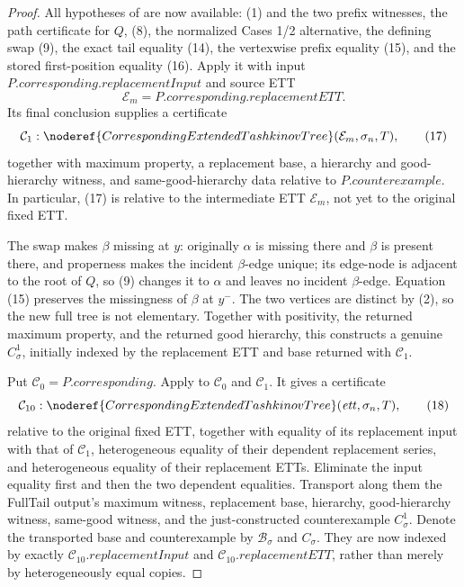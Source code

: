 \begin{proof}
All hypotheses of  are now
available: (1) and the two prefix witnesses, the path certificate for
\(Q\), (8), the normalized Cases 1/2 alternative, the defining swap (9),
the exact tail equality (14), the vertexwise prefix equality (15), and the
stored first-position equality (16).  Apply it with input
\(P.\mathit{corresponding}.\mathit{replacementInput}\) and source ETT
\[
 \mathcal E_m=P.\mathit{corresponding}.\mathit{replacementETT}.
\]
Its final conclusion supplies a certificate
\[
 \mathcal C_1:
 \noderef{CorrespondingExtendedTashkinovTree}
   (\mathcal E_m,\sigma_n,T),                                  \tag{17}
\]
together with maximum property, a replacement base, a hierarchy and
good-hierarchy witness, and same-good-hierarchy data relative to
\(P.\mathit{counterexample}\).  In particular, (17) is relative to the
intermediate ETT \(\mathcal E_m\), not yet to the original fixed ETT.

The swap makes \(\beta\) missing at \(y\): originally \(\alpha\) is
missing there and \(\beta\) is present there, and properness makes the
incident \(\beta\)-edge unique; its edge-node is adjacent to the root of
\(Q\), so (9) changes it to \(\alpha\) and leaves no incident
\(\beta\)-edge.  Equation (15) preserves the missingness of \(\beta\) at
\(y^-\).  The two vertices are distinct by (2), so the new full tree is
not elementary.  Together with positivity, the returned maximum property,
and the returned good hierarchy, this constructs a genuine
 \(C_\sigma^1\), initially indexed by
the replacement ETT and base returned with \(\mathcal C_1\).

Put \(\mathcal C_0=P.\mathit{corresponding}\).  Apply
 to
\(\mathcal C_0\) and \(\mathcal C_1\).  It gives a certificate
\[
 \mathcal C_{10}:
 \noderef{CorrespondingExtendedTashkinovTree}
    (\mathit{ett},\sigma_n,T),                                 \tag{18}
\]
relative to the original fixed ETT, together with equality of its
replacement input with that of \(\mathcal C_1\), heterogeneous equality
of their dependent replacement series, and heterogeneous equality of
their replacement ETTs.  Eliminate the input equality first and then the
two dependent equalities.  Transport along them the FullTail output's
maximum witness, replacement base, hierarchy, good-hierarchy witness,
same-good witness, and the just-constructed counterexample
\(C_\sigma^1\).  Denote the transported base and counterexample by
\(\mathcal B_\sigma\) and \(C_\sigma\).  They are now indexed by exactly
\(\mathcal C_{10}.\mathit{replacementInput}\) and
\(\mathcal C_{10}.\mathit{replacementETT}\), rather than merely by
heterogeneously equal copies.


\end{proof}
